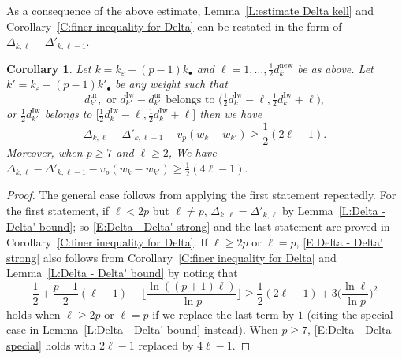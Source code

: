 \documentclass[12pt]{amsart}
\newtheorem{corollary}[subsection]{Corollary}
\theoremstyle{definition}
\numberwithin{equation}{subsection}
\newcommand{\new}{\mathrm{new}}
\newcommand{\Iw}{\mathrm{Iw}}
\newcommand{\ur}{\mathrm{ur}}
\begin{document}
As a consequence of the above estimate, Lemma~\ref{L:estimate Delta kell} and Corollary~\ref{C:finer inequality for Delta} can be restated in the form of $\Delta_{k, \ell}- \Delta'_{k, \ell-1}$.
\begin{corollary}
\label{C:Delta - Delta'}
Let $k=k_\varepsilon + (p-1)k_\bullet $ and $\ell = 1, \dots, \frac 12d_k^\new$ be as above. Let $k' = k_\varepsilon + (p-1)k'_\bullet$ be any weight such that 
$$
d_{k'}^\ur, \textrm{ or } d_{k'}^\Iw - d_{k'}^\ur \textrm{ belongs to } \big(\tfrac 12d_k^\Iw-\ell, \tfrac 12 d_k^\Iw+\ell\big),
$$
or $\tfrac 12 d_{k'}^\Iw$ belongs to $\big[\tfrac 12d_k^\Iw-\ell, \tfrac 12 d_k^\Iw+\ell\big]$
then we have
\begin{equation}
\label{E:Delta - Delta' strong}
\Delta_{k, \ell} - \Delta'_{k,\ell-1} -v_p(w_{k} - w_{k'}) \geq \frac 12 (2\ell-1).
\end{equation}
Moreover, when $p \geq 7$ and $\ell \geq 2$, We have $\Delta_{k, \ell}-\Delta'_{k, \ell-1} -v_p(w_{k} - w_{k'}) \geq \frac 12 (4\ell-1).$
\end{corollary}
\begin{proof}
The general case follows from applying the first statement repeatedly. For the first statement, if $\ell < 2p$ but $\ell \neq p$, $\Delta_{k, \ell} = \Delta'_{k, \ell}$ by Lemma~\ref{L:Delta - Delta' bound}; so \eqref{E:Delta - Delta' strong} and the last statement are proved in Corollary~\ref{C:finer inequality for Delta}.
If $\ell \geq 2p$ or $\ell =p$, \eqref{E:Delta - Delta' strong} also follows from Corollary~\ref{C:finer inequality for Delta} and Lemma~\ref{L:Delta - Delta' bound} by noting that
\begin{equation}
\label{E:Delta - Delta' special}
\frac 12+
\frac{p-1}2(\ell-1) -\Big \lfloor \frac{\ln((p+1) \ell)}{\ln p}\Big\rfloor  \geq \frac 12(2\ell-1) +3 \Big( \frac{\ln \ell }{\ln p}\Big)^2
\end{equation}
holds when $\ell \geq 2p$ or $\ell = p$ if we replace the last term by $1$ (citing the special case in Lemma~\ref{L:Delta - Delta' bound} instead). When $p \geq 7$, \eqref{E:Delta - Delta' special} holds with $2\ell-1$ replaced by $4 \ell -1$.
\end{proof}
\end{document}
